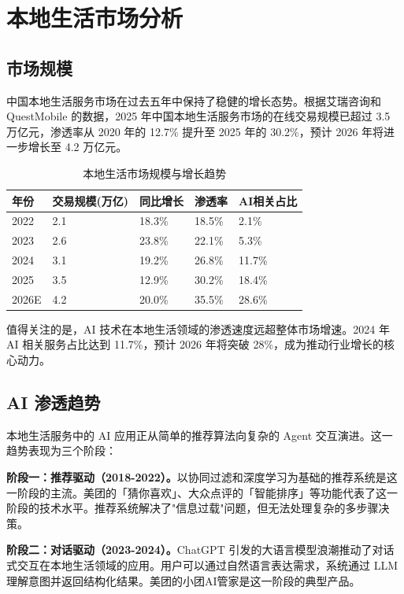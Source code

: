 \documentclass[12pt,a4paper]{ctexart}
\begin{document}
\section{本地生活市场分析}

\subsection{市场规模}

中国本地生活服务市场在过去五年中保持了稳健的增长态势。根据艾瑞咨询和 QuestMobile 的数据，2025 年中国本地生活服务市场的在线交易规模已超过 3.5 万亿元，渗透率从 2020 年的 12.7\% 提升至 2025 年的 30.2\%，预计 2026 年将进一步增长至 4.2 万亿元。

\begin{table}[H]
\centering
\caption{本地生活市场规模与增长趋势}
\label{tab:market-size}
\renewcommand{\arraystretch}{1.3}
\begin{tabular}{p{2cm} p{3cm} p{2.5cm} p{2.5cm} p{2.5cm}}
\toprule
\textbf{年份} & \textbf{交易规模(万亿)} & \textbf{同比增长} & \textbf{渗透率} & \textbf{AI相关占比} \\
\midrule
2022 & 2.1 & 18.3\% & 18.5\% & 2.1\% \\
2023 & 2.6 & 23.8\% & 22.1\% & 5.3\% \\
2024 & 3.1 & 19.2\% & 26.8\% & 11.7\% \\
2025 & 3.5 & 12.9\% & 30.2\% & 18.4\% \\
2026E & 4.2 & 20.0\% & 35.5\% & 28.6\% \\
\bottomrule
\end{tabular}
\end{table}

值得关注的是，AI 技术在本地生活领域的渗透速度远超整体市场增速。2024 年 AI 相关服务占比达到 11.7\%，预计 2026 年将突破 28\%，成为推动行业增长的核心动力。

\subsection{AI 渗透趋势}

本地生活服务中的 AI 应用正从简单的推荐算法向复杂的 Agent 交互演进。这一趋势表现为三个阶段：

\textbf{阶段一：推荐驱动（2018-2022）。}以协同过滤和深度学习为基础的推荐系统是这一阶段的主流。美团的「猜你喜欢」、大众点评的「智能排序」等功能代表了这一阶段的技术水平。推荐系统解决了"信息过载"问题，但无法处理复杂的多步骤决策。

\textbf{阶段二：对话驱动（2023-2024）。}ChatGPT 引发的大语言模型浪潮推动了对话式交互在本地生活领域的应用。用户可以通过自然语言表达需求，系统通过 LLM 理解意图并返回结构化结果。美团的小团AI管家是这一阶段的典型产品。
\end{document}
